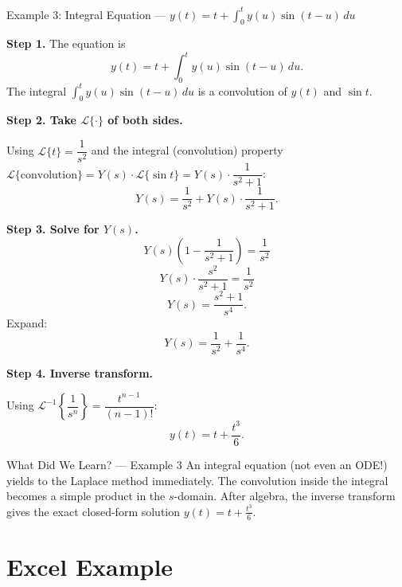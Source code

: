 \documentclass[12pt,a4paper]{article}
\begin{document}
\begin{infobox}{Example 3: Integral Equation --- \(y(t) = t + \int_0^t y(u)\sin(t-u)\,du\)}

\textbf{Step 1.} The equation is
\[
  y(t) = t + \int_0^t y(u)\sin(t-u)\,du.
\]
The integral \(\int_0^t y(u)\sin(t-u)\,du\) is a convolution of \(y(t)\) and \(\sin t\).

\textbf{Step 2. Take \(\mathcal{L}\{\cdot\}\) of both sides.}

Using \(\mathcal{L}\{t\} = \dfrac{1}{s^2}\) and the integral (convolution) property
\(\mathcal{L}\{\text{convolution}\} = Y(s)\cdot\mathcal{L}\{\sin t\} = Y(s)\cdot\dfrac{1}{s^2+1}\):
\[
  Y(s) = \frac{1}{s^2} + Y(s)\cdot\frac{1}{s^2+1}.
\]

\textbf{Step 3. Solve for \(Y(s)\).}
\[
  Y(s)\left(1 - \frac{1}{s^2+1}\right) = \frac{1}{s^2}
\]
\[
  Y(s)\cdot\frac{s^2}{s^2+1} = \frac{1}{s^2}
\]
\[
  Y(s) = \frac{s^2+1}{s^4}.
\]
Expand:
\[
  Y(s) = \frac{1}{s^2} + \frac{1}{s^4}.
\]

\textbf{Step 4. Inverse transform.}

Using \(\mathcal{L}^{-1}\!\left\{\dfrac{1}{s^n}\right\} = \dfrac{t^{n-1}}{(n-1)!}\):
\[
  y(t) = t + \frac{t^3}{6}.
\]
\end{infobox}

\begin{learnbox}{What Did We Learn? --- Example 3}
An integral equation (not even an ODE!) yields to the Laplace method immediately.
The convolution inside the integral becomes a simple product in the \(s\)-domain.
After algebra, the inverse transform gives the exact closed-form solution \(y(t)=t+\tfrac{t^3}{6}\).
\end{learnbox}

\section{Excel Example}
\end{document}
